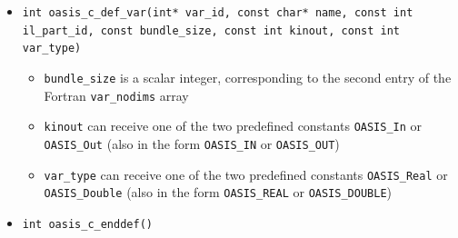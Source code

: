 \begin{itemize}
\vspace{0.2cm}
\item {\tt int oasis\_c\_def\_var(int* var\_id, const char* name, const int il\_part\_id, const bundle\_size, const int kinout, const int var\_type)}
  \begin{itemize}
  \item {\tt bundle\_size} is a scalar integer, corresponding to the
    second entry of the Fortran {\tt var\_nodims} array
  \item {\tt kinout} can receive one of the two predefined constants
    {\tt OASIS\_In} or {\tt OASIS\_Out} (also in the form
    {\tt OASIS\_IN} or {\tt OASIS\_OUT})
  \item {\tt var\_type} can receive one of the two predefined constants
    {\tt OASIS\_Real} or {\tt OASIS\_Double} (also in the form
    {\tt OASIS\_REAL} or {\tt OASIS\_DOUBLE})
  \end{itemize}

\vspace{0.2cm}
\item {\tt int oasis\_c\_enddef()}


\end{itemize}
